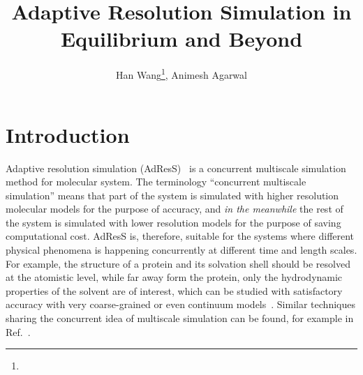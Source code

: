\documentclass[epjST]{svjour}
\begin{document}
%
\title{Adaptive Resolution Simulation in Equilibrium and Beyond}
\author{Han Wang\fnmsep\thanks{}, Animesh Agarwal}
%
%
%
\maketitle
%

\section{Introduction}

Adaptive resolution simulation (AdResS)~\cite{praprotnik2005adaptive,praprotnik2006adaptive,praprotnik2007adaptive,praprotnik2008multiscale,poma2010classical,poblete2010coupling,praprotnik2011statistical,fritsch2012adaptive,bevc2013adaptive} is a concurrent multiscale simulation method for molecular system.
The terminology ``concurrent multiscale simulation'' means that
part of the system is simulated with higher resolution molecular models for the
purpose of accuracy, and \emph{in the meanwhile} the rest of the system is
simulated with lower resolution models for the purpose of saving computational cost.
AdResS is, therefore, suitable for the systems where different physical
phenomena is happening concurrently at different time and length scales. For example,
the structure of a protein and its solvation shell
should be resolved at the atomistic level, while far away form the protein,
only the hydrodynamic properties of the solvent are of interest, which can be studied with satisfactory
accuracy with very coarse-grained or even continuum
models~\cite{zavadlav2014adaptive,zavadlav2014adaptive1,delgado2009coupling}.
Similar  
techniques sharing the concurrent idea of multiscale simulation can be found, for example in Ref.~\cite{ensing2007energy,heyes2010thermodynamic,shi2006mixed,shen2014resolution,nielsen2010adaptive}.
\end{document}
